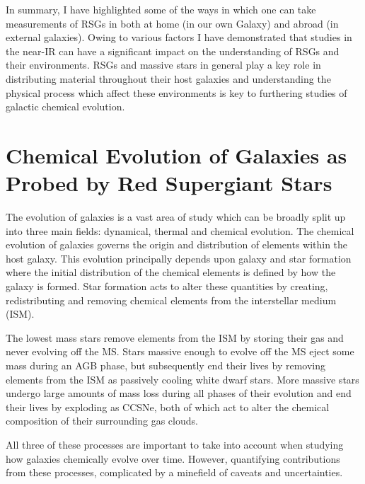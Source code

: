 In summary, I have highlighted some of the ways in which one can take measurements of RSGs in both at home (in our own Galaxy) and abroad (in external galaxies).
Owing to various factors I have demonstrated that studies in the near-IR can have a significant impact on the understanding of RSGs and their environments.
RSGs and massive stars in general play a key role in distributing material throughout their host galaxies and understanding the physical process which affect these environments is key to furthering studies of galactic chemical evolution.




\section{Chemical Evolution of Galaxies as Probed by Red Supergiant Stars} %
\label{sec:chemical evolution}


The evolution of galaxies is a vast area of study which can be broadly split up into three main fields: dynamical, thermal and chemical evolution.
The chemical evolution of galaxies governs the origin and distribution of elements within the host galaxy.
This evolution principally depends upon galaxy and star formation where
the initial distribution of the chemical elements is defined by how the galaxy is formed.
Star formation acts to alter these quantities by creating, redistributing and removing chemical elements from the interstellar medium (ISM).

The lowest mass stars remove elements from the ISM by storing their gas and never evolving off the MS.
Stars massive enough to evolve off the MS eject some mass during an AGB phase, but subsequently end their lives by removing elements from the ISM as passively cooling white dwarf stars.
More massive stars undergo large amounts of mass loss during all phases of their evolution and end their lives by exploding as CCSNe, both of which act to alter the chemical composition of their surrounding gas clouds.

All three of these processes are important to take into account when studying how galaxies chemically evolve over time.
However, quantifying contributions from these processes, complicated by a minefield of caveats and uncertainties.

